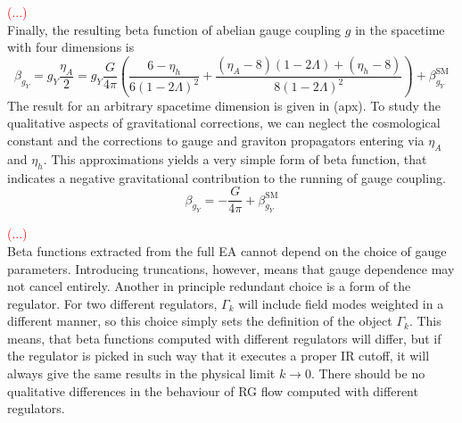 \documentclass[11pt, a4paper]{article}
\begin{document}

\textcolor{red}{(...)}\\

Finally, the resulting beta function of abelian gauge coupling $g$ in the spacetime with four dimensions is
\begin{equation}
    \beta_{g_Y} = g_Y \frac{\eta_A}{2} = g_Y \frac{G}{4 \pi} \left( \frac{6 - \eta_h}{6(1-2 \Lambda)^2} + 
    \frac{(\eta_A-8)(1-2\Lambda) + (\eta_h -8)}{8 (1-2 \Lambda )^2}\right) + \beta_{g_Y}^{\text{SM}}
\end{equation}
The result for an arbitrary spacetime dimension is given in (apx).
To study the qualitative aspects of gravitational corrections, we can neglect the cosmological constant and
the corrections to gauge and graviton propagators entering via $\eta_A$ and $\eta_h$. This approximations
yields a very simple form of beta function, that indicates a negative gravitational contribution to the running
of gauge coupling.
\begin{equation}
    \beta_{g_Y} = - \frac{G}{4 \pi} + \beta_{g_Y}^{\text{SM}}
\end{equation}

\textcolor{red}{(...)}\\

Beta functions extracted from the full EA cannot depend on the choice of gauge parameters.
Introducing truncations, however, means that gauge dependence may not cancel entirely.
Another in principle redundant choice is a form of the regulator. For two different regulators,
$\Gamma_k$ will include field modes weighted in a different manner, so this choice simply
sets the definition of the object $\Gamma_k$. 
This means, that beta functions computed with different regulators will differ, but
if the regulator is picked in such way that it executes a proper IR cutoff,
it will always give the same results in the physical limit $k \rightarrow 0$. There should be no
qualitative differences in the behaviour of RG flow computed with different regulators.
\end{document}
